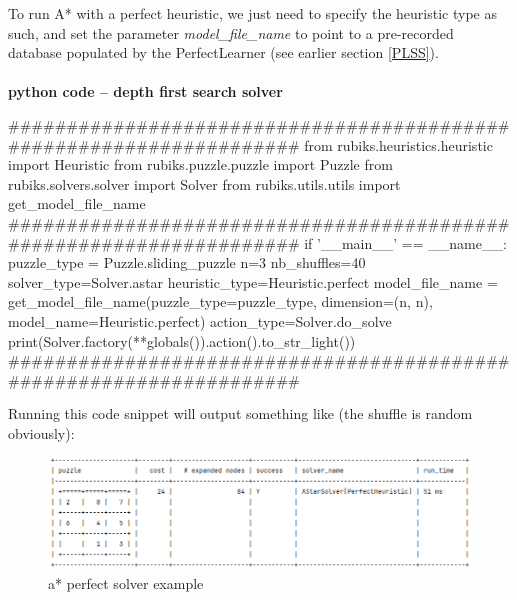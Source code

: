 To run A{*} with a perfect heuristic, we just need to specify the heuristic type as such, and set the parameter \textit{model\_file\_name} to point to a pre-recorded database populated by the PerfectLearner (see earlier section \ref{PLSS}).


\afblue
\paragraph{}{\textbf{python code -- depth first search solver}}
\begin{python}
####################################################################
from rubiks.heuristics.heuristic import Heuristic
from rubiks.puzzle.puzzle import Puzzle
from rubiks.solvers.solver import Solver
from rubiks.utils.utils import get_model_file_name
####################################################################
if '__main__' == __name__:
    puzzle_type = Puzzle.sliding_puzzle
    n=3
    nb_shuffles=40
    solver_type=Solver.astar
    heuristic_type=Heuristic.perfect
    model_file_name = get_model_file_name(puzzle_type=puzzle_type,
                                          dimension=(n, n),
                                          model_name=Heuristic.perfect)
    action_type=Solver.do_solve
    print(Solver.factory(**globals()).action().to_str_light())
####################################################################
\end{python}
\black
Running this code snippet will output something like (the shuffle is random obviously):


\begin{figure}[H]
\centering
\includegraphics[scale=0.5]{./Figures/exampleastarperfectsolver}
\caption[Examples]{a* perfect solver example}
\label{fig:exampleastarperfectsolver}
\end{figure}





